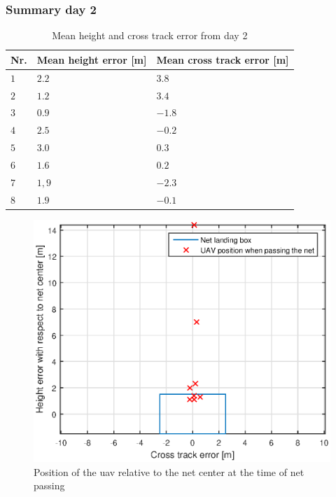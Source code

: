 \subsubsection{Summary day 2}
\begin{table}[H]
\centering
\begin{tabular}{| l | l | l |}
\hline
\textbf{Nr.} 	& \textbf{Mean height error [m]} 	& \textbf{Mean cross track error [m]}  \\ \hline
$1$				& $2.2$							& $3.8$										\\ \hline
$2$				& $1.2$							& $3.4$										\\ \hline
$3$				& $0.9$							& $-1.8$									\\ \hline
$4$				& $2.5$							& $-0.2$									\\ \hline
$5$				& $3.0$							& $0.3$										\\ \hline
$6$				& $1.6$							& $0.2$										\\ \hline
$7$				& $1,9$							& $-2.3$									\\ \hline
$8$				& $1.9$							& $-0.1$									\\ \hline
\end{tabular}
\caption{Mean height and cross track error from day 2}
\end{table}
\begin{figure}[H]
\centering
\includegraphics[scale=0.7]{figs/Experiment/day2NetHit.eps}
\caption{Position of the \gls{uav} relative to the net center at the time of net passing}
\label{Fig:Day2NetPass}
\end{figure}
